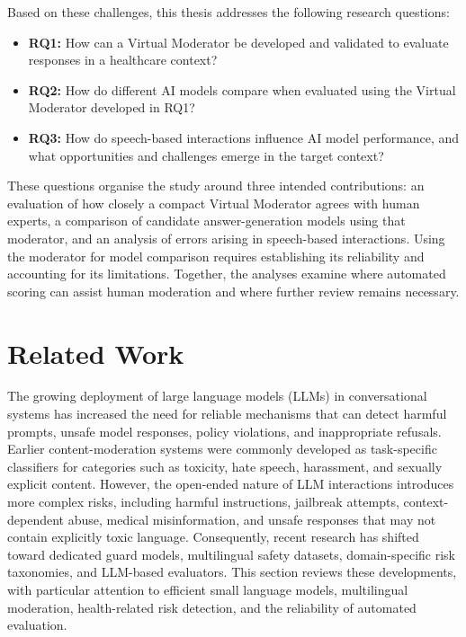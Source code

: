 \documentclass[11pt,a4paper]{article}
\begin{document}
Based on these challenges, this thesis addresses the following research
questions:

\begin{itemize}[nosep]
    \item \textbf{RQ1:} How can a Virtual Moderator be developed and validated to evaluate responses in a healthcare context?

    \item \textbf{RQ2:} How do different AI models compare when evaluated using the Virtual Moderator developed in RQ1?

    \item \textbf{RQ3:} How do speech-based interactions influence AI model performance, and what opportunities and challenges emerge in the target context?
\end{itemize}

These questions organise the study around three intended contributions:
an evaluation of how closely a compact Virtual Moderator agrees with human
experts, a comparison of candidate answer-generation models using that
moderator, and an analysis of errors arising in speech-based interactions.
Using the moderator for model comparison requires establishing its reliability
and accounting for its limitations. Together, the analyses examine where
automated scoring can assist human moderation and where further review remains
necessary.

\section{Related Work}
\label{sec:related-work}


The growing deployment of large language models (LLMs) in conversational systems has increased the need for reliable mechanisms that can detect harmful prompts, unsafe model responses, policy violations, and inappropriate refusals. Earlier content-moderation systems were commonly developed as task-specific classifiers for categories such as toxicity, hate speech, harassment, and sexually explicit content. However, the open-ended nature of LLM interactions introduces more complex risks, including harmful instructions, jailbreak attempts, context-dependent abuse, medical misinformation, and unsafe responses that may not contain explicitly toxic language. Consequently, recent research has shifted toward dedicated guard models, multilingual safety datasets, domain-specific risk taxonomies, and LLM-based evaluators. This section reviews these developments, with particular attention to efficient small language models, multilingual moderation, health-related risk detection, and the reliability of automated evaluation.
\end{document}
